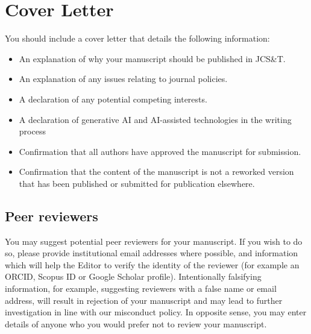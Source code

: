 \documentclass{jcst}
\begin{document}
\section{Cover Letter}
You should include a cover letter that details the following information:
\begin{itemize}
    \item 	An explanation of why your manuscript should be published in JCS\&T.
	\item An explanation of any issues relating to journal policies.
\item 		A declaration of any potential competing interests.
\item 	A declaration of generative AI and AI-assisted technologies in the writing process
\item 		Confirmation that all authors have approved the manuscript for submission.
\item 		Confirmation that the content of the manuscript is not a reworked version that has been published or submitted for publication elsewhere.
\end{itemize}

\subsection{Peer reviewers}

You may suggest potential peer reviewers for your manuscript. If you wish to do so, please provide institutional email addresses where possible, and information which will help the Editor to verify the identity of the reviewer (for example an ORCID,  Scopus ID or Google Scholar profile). Intentionally falsifying information, for example, suggesting reviewers with a false name or email address, will result in rejection of your manuscript and may lead to further investigation in line with our misconduct policy.
In opposite sense, you may enter details of anyone who you would prefer not to review your manuscript.
\end{document}
